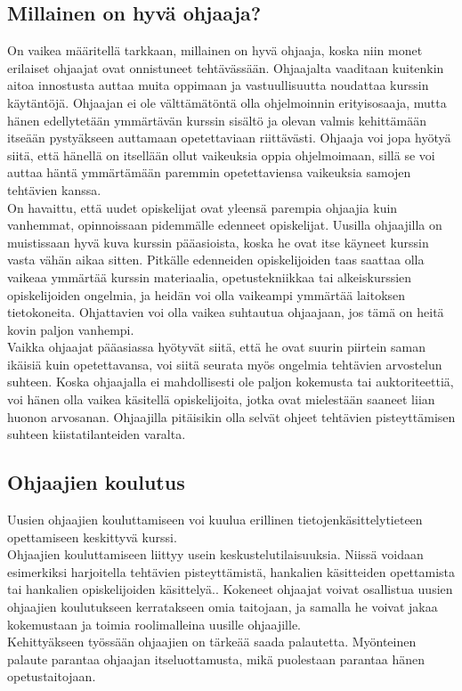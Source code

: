 \documentclass[finnish]{tktltiki2}
\theoremstyle{definition}
\theoremstyle{remark}
\begin{document}
\subsection{Millainen on hyvä ohjaaja?}
On vaikea määritellä tarkkaan, millainen on hyvä ohjaaja, koska niin monet erilaiset ohjaajat ovat onnistuneet tehtävässään. Ohjaajalta vaaditaan kuitenkin aitoa innostusta auttaa muita oppimaan ja vastuullisuutta noudattaa kurssin käytäntöjä. Ohjaajan ei ole välttämätöntä olla ohjelmoinnin erityisosaaja, mutta hänen edellytetään ymmärtävän kurssin sisältö ja olevan valmis kehittämään itseään pystyäkseen auttamaan opetettaviaan riittävästi.\cite{Reges88} Ohjaaja voi jopa hyötyä siitä, että hänellä on itsellään ollut vaikeuksia oppia ohjelmoimaan, sillä se voi auttaa häntä ymmärtämään paremmin opetettaviensa vaikeuksia samojen tehtävien kanssa.\cite{Decker06}
\\
On havaittu, että uudet opiskelijat ovat yleensä parempia ohjaajia kuin vanhemmat, opinnoissaan pidemmälle edenneet opiskelijat. Uusilla ohjaajilla on muistissaan hyvä kuva kurssin pääasioista, koska he ovat itse käyneet kurssin vasta vähän aikaa sitten.\cite{Dickson11} Pitkälle edenneiden opiskelijoiden taas saattaa olla vaikeaa ymmärtää kurssin materiaalia, opetustekniikkaa tai alkeiskurssien opiskelijoiden ongelmia, ja heidän voi olla vaikeampi ymmärtää laitoksen tietokoneita.\cite{Reges88} Ohjattavien voi olla vaikea suhtautua ohjaajaan, jos tämä on heitä kovin paljon vanhempi.\cite{Decker06}
\\
Vaikka ohjaajat pääasiassa hyötyvät siitä, että he ovat suurin piirtein saman ikäisiä kuin opetettavansa, voi siitä seurata myös ongelmia tehtävien arvostelun suhteen. Koska ohjaajalla ei mahdollisesti ole paljon kokemusta tai auktoriteettiä, voi hänen olla vaikea käsitellä opiskelijoita, jotka ovat mielestään saaneet liian huonon arvosanan. Ohjaajilla pitäisikin olla selvät ohjeet tehtävien pisteyttämisen suhteen kiistatilanteiden varalta.\cite{Roberts95}


\subsection{Ohjaajien koulutus}

Uusien ohjaajien kouluttamiseen voi kuulua erillinen tietojenkäsittelytieteen opettamiseen keskittyvä kurssi.\cite{Reges88, Roberts95}
\\
Ohjaajien kouluttamiseen liittyy usein keskustelutilaisuuksia. Niissä voidaan esimerkiksi harjoitella tehtävien pisteyttämistä, hankalien käsitteiden opettamista tai hankalien opiskelijoiden käsittelyä.\cite{Reges03}. Kokeneet ohjaajat voivat osallistua uusien ohjaajien koulutukseen kerratakseen omia taitojaan, ja samalla he voivat jakaa kokemustaan ja toimia roolimalleina uusille ohjaajille.\cite{Reges88} 
\\
Kehittyäkseen työssään ohjaajien on tärkeää saada palautetta.\cite{Patitsas12} Myönteinen palaute parantaa ohjaajan itseluottamusta, mikä puolestaan parantaa hänen opetustaitojaan.
\end{document}
